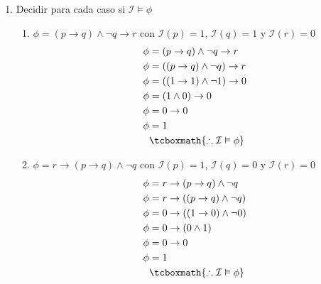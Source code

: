 \documentclass[10pt,letterpaper]{article}
\begin{document}
\begin{enumerate}
    \clearpage
    \item Decidir para cada caso si $\mathcal{I} \vDash \phi$
        \begin{enumerate}
            \item $\phi = (p \rightarrow q) \land \neg q \rightarrow r$ con
                $\mathcal{I}(p) = 1$, $\mathcal{I}(q) = 1$ y $\mathcal{I}(r) = 0$
                \begin{equation*} \begin{split} \begin{aligned}
                    \phi &= (p \rightarrow q) \land \neg q \rightarrow r \\
                    \phi &= ((p \rightarrow q) \land \neg q) \rightarrow r \\
                    \phi &= ((1 \rightarrow 1) \land \neg 1) \rightarrow 0 \\
                    \phi &= (1 \land 0) \rightarrow 0 \\
                    \phi &= 0 \rightarrow 0 \\
                    \phi &= 1 \\
                    &\tcboxmath{\therefore \mathcal{I} \vDash \phi}
                \end{aligned} \end{split} \end{equation*}

            \item $\phi = r \rightarrow (p \rightarrow q) \land \neg q$ con
                $\mathcal{I}(p) = 1$, $\mathcal{I}(q) = 0$ y $\mathcal{I}(r) = 0$
                \begin{equation*} \begin{split} \begin{aligned}
                    \phi &= r \rightarrow (p \rightarrow q) \land \neg q \\
                    \phi &= r \rightarrow ((p \rightarrow q) \land \neg q) \\
                    \phi &= 0 \rightarrow ((1 \rightarrow 0) \land \neg 0) \\
                    \phi &= 0 \rightarrow (0 \land 1) \\
                    \phi &= 0 \rightarrow 0 \\
                    \phi &= 1 \\
                    &\tcboxmath{\therefore \mathcal{I} \vDash \phi}
                \end{aligned} \end{split} \end{equation*}


\end{enumerate}
\end{enumerate}
\end{document}

